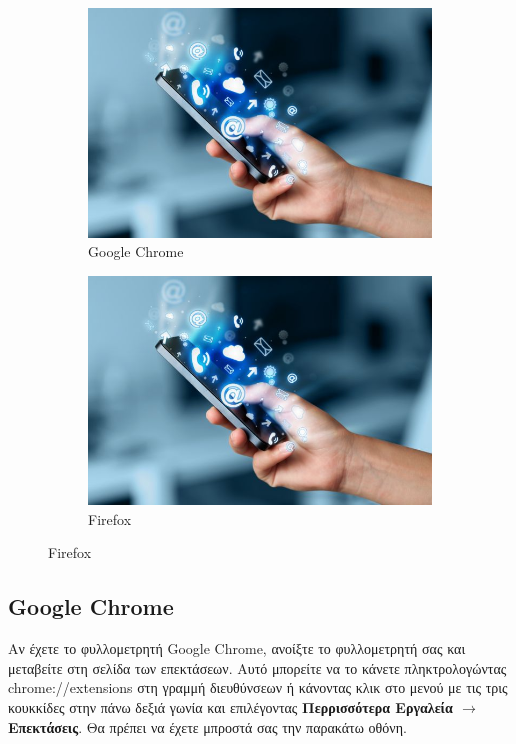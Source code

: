 \documentclass{article}
\begin{document}
\begin{figure}[H]
    \centering
    \begin{subfigure}{.45\textwidth}
        \includegraphics[width=\textwidth]{logo}
        \caption{Google Chrome}
        \label{Fig:sub1}
    \end{subfigure}
    \hfill
    \begin{subfigure}{.45\textwidth}
        \includegraphics[width=\textwidth]{logo}
        \caption{Firefox}
        \label{Fig:sub2}
    \end{subfigure}
\end{figure}

\subsection*{Google Chrome}
Αν έχετε το φυλλομετρητή Google Chrome, ανοίξτε το φυλλομετρητή σας και μεταβείτε στη σελίδα των επεκτάσεων. Αυτό μπορείτε να το κάνετε πληκτρολογώντας chrome://extensions στη γραμμή διευθύνσεων ή κάνοντας κλικ στο μενού με τις τρις κουκκίδες στην πάνω δεξιά γωνία και επιλέγοντας \textbf{Περρισσότερα Εργαλεία $\rightarrow$ Επεκτάσεις}. Θα πρέπει να έχετε μπροστά σας την παρακάτω οθόνη.
\end{document}
